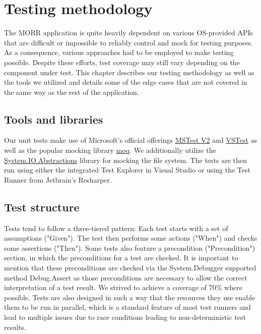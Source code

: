 \chapter{Testing methodology}

The MORR application is quite heavily dependent on various OS-provided APIs that are difficult or impossible to reliably control and mock for testing purposes. As a consequence, various approaches had to be employed to make testing possible. Despite these efforts, test coverage may still vary depending on the component under test. This chapter describes our testing methodology as well as the tools we utilized and details some of the edge cases that are not covered in the same way as the rest of the application.

\section{Tools and libraries}

Our unit tests make use of Microsoft's official offerings \href{https://github.com/microsoft/testfx}{MSTest V2} and \href{https://github.com/microsoft/vstest}{VSTest} as well as the popular mocking library \href{https://github.com/moq/moq4}{moq}. We additionally utilize the \href{https://github.com/System-IO-Abstractions/System.IO.Abstractions}{System.IO.Abstractions} library for mocking the file system. The tests are then run using either the integrated Test Explorer in Visual Studio or using the Test Runner from Jetbrain's Resharper.

\section{Test structure}

Tests tend to follow a three-tiered pattern: Each test starts with a set of assumptions ("Given"). The test then performs some actions ("When") and checks some assertions ("Then").
Some tests also feature a precondition ("Precondition") section, in which the preconditions for a test are checked. It is important to mention that these preconditions are checked via the System.Debugger supported method Debug.Assert as those preconditions are necessary to allow the correct interpretation of a test result.
We strived to achieve a coverage of 70\% where possible.
Tests are also designed in such a way that the resources they use enable them to be run in parallel, which is a standard feature of most test runners and lead to multiple issues due to race conditions leading to non-deterministic test results.

